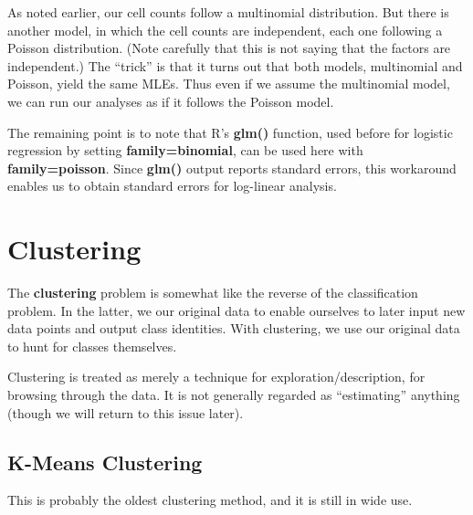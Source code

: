 As noted earlier, our cell counts follow a multinomial distribution.
But there is another model, in which the cell counts are independent,
each one following a Poisson distribution.  (Note carefully that this is
not saying that the factors are independent.) The ``trick'' is that it
turns out that both models, multinomial and Poisson, yield the same
MLEs.  Thus even if we assume the multinomial model, we can run our
analyses as if it follows the Poisson model.

The remaining point is to note that R's {\bf glm()} function, used
before for logistic regression by setting {\bf family=binomial}, can be
used here with {\bf family=poisson}.  Since {\bf glm()} output reports
standard errors, this workaround enables us to obtain standard errors
for log-linear analysis.


% 
% 

\section{Clustering}

The {\bf clustering} problem is somewhat like the reverse of the
classification problem.  In the latter, we our original data to enable
ourselves to later input new data points and output class identities.
With clustering, we use our original data to hunt for classes
themselves.

Clustering is treated as merely a technique for exploration/description,
for browsing through the data.  It is not generally regarded as
``estimating'' anything (though we will return to this issue later).

\subsection{K-Means Clustering}

This is probably the oldest clustering method, and it is still in wide
use.


